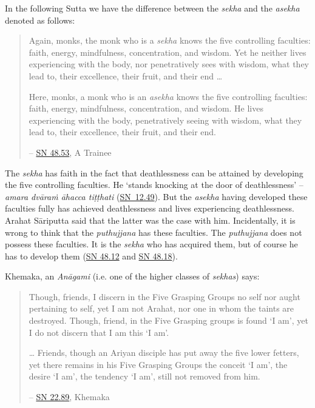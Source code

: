 In the following Sutta we have the difference between the \emph{sekha} and the \emph{asekha} denoted as follows:

\begin{quote}
Again, monks, the monk who is a \emph{sekha} knows the five controlling faculties: faith, energy, mindfulness, concentration, and wisdom. Yet he neither lives experiencing with the body, nor penetratively sees with wisdom, what they lead to, their excellence, their fruit, and their end \ldots{}

Here, monks, a monk who is an \emph{asekha} knows the five controlling faculties: faith, energy, mindfulness, concentration, and wisdom. He lives experiencing with the body, \mbox{penetratively} seeing with wisdom, what they lead to, their excellence, their fruit, and their end.

-- \href{https://suttacentral.net/sn48.53/en/sujato}{SN 48.53}, A Trainee
\end{quote}

The \emph{sekha} has faith in the fact that deathlessness can be attained by developing the five controlling faculties. He `stands knocking at the door of deathlessness' -- \emph{amara dvāraṁ āhacca tiṭṭhati} (\href{https://suttacentral.net/sn12.49/en/bodhi}{SN~12.49}). But the \emph{asekha} having developed these faculties fully has achieved deathlessness and lives experiencing deathlessness. Arahat Sāriputta said that the latter was the case with him. Incidentally, it is wrong to think that the \emph{puthujjana} has these faculties. The \emph{puthujjana} does not possess these faculties. It is the \emph{sekha} who has acquired them, but of course he has to develop them (\href{https://suttacentral.net/sn48.12/en/sujato}{SN 48.12} and \href{https://suttacentral.net/sn48.18/en/sujato}{SN 48.18}).

Khemaka, an \emph{Anāgami} (i.e. one of the higher classes of \emph{sekhas}) says:

\begin{quote}
Though, friends, I discern in the Five Grasping Groups no self nor aught pertaining to self, yet I am not Arahat, nor one in whom the taints are destroyed. Though, friend, in the Five Grasping groups is found `I am', yet I do not discern that I am this `I am'.

\ldots{} Friends, though an Ariyan disciple has put away the five lower fetters, yet there remains in his Five Grasping Groups the conceit `I am', the desire `I am', the tendency `I am', still not removed from him.

 -- \href{https://suttacentral.net/sn22.89/en/bodhi}{SN 22.89}, Khemaka
\end{quote}

